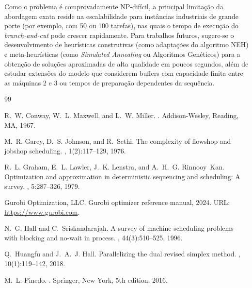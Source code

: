 \documentclass[11pt,a4paper]{article}
\begin{document}
Como o problema é comprovadamente NP-difícil, a principal limitação da abordagem exata reside na escalabilidade para instâncias industriais de grande porte (por exemplo, com 50 ou 100 tarefas), nas quais o tempo de execução do \textit{branch-and-cut} pode crescer rapidamente. Para trabalhos futuros, sugere-se o desenvolvimento de heurísticas construtivas (como adaptações do algoritmo NEH) e meta-heurísticas (como \textit{Simulated Annealing} ou Algoritmos Genéticos) para a obtenção de soluções aproximadas de alta qualidade em poucos segundos, além de estudar extensões do modelo que considerem buffers com capacidade finita entre as máquinas 2 e 3 ou tempos de preparação dependentes da sequência.

\begin{thebibliography}{99}

R.~W. Conway, W.~L. Maxwell, and L.~W. Miller.
.
\newblock Addison-Wesley, Reading, MA, 1967.

M.~R. Garey, D.~S. Johnson, and R.~Sethi.
\newblock The complexity of flowshop and jobshop scheduling.
, 1(2):117--129, 1976.

R.~L. Graham, E.~L. Lawler, J.~K. Lenstra, and A.~H.~G. Rinnooy~Kan.
\newblock Optimization and approximation in deterministic sequencing and scheduling: A survey.
, 5:287--326, 1979.

{Gurobi Optimization, LLC}.
\newblock Gurobi optimizer reference manual, 2024.
\newblock URL: \url{https://www.gurobi.com}.

N.~G. Hall and C.~Sriskandarajah.
\newblock A survey of machine scheduling problems with blocking and no-wait in process.
, 44(3):510--525, 1996.

Q.~Huangfu and J.~A.~J. Hall.
\newblock Parallelizing the dual revised simplex method.
, 10(1):119--142, 2018.

M.~L. Pinedo.
.
\newblock Springer, New York, 5th edition, 2016.

\end{thebibliography}
\end{document}
